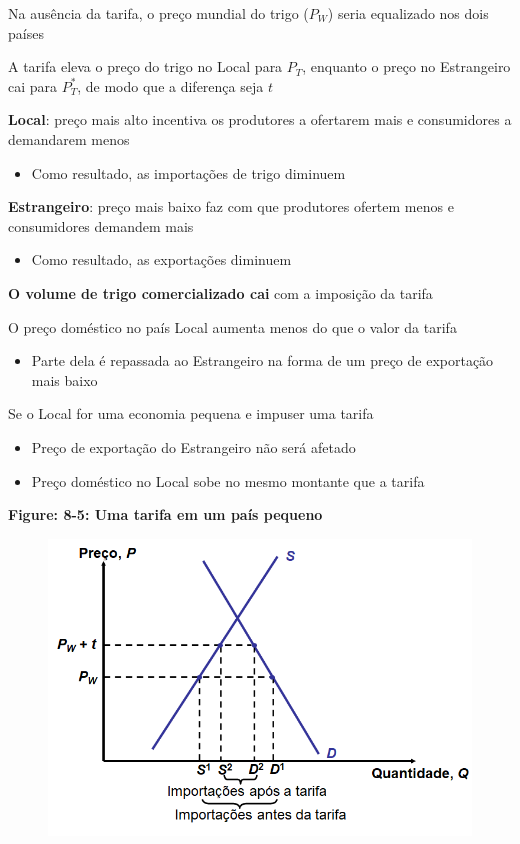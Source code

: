 \documentclass[a4paper,12pt]{article}[abntex2]
\begin{document}
Na ausência da tarifa, o preço mundial do trigo ($P_W$) seria equalizado nos dois países

A tarifa eleva o preço do trigo no Local para $P_T$, enquanto o preço no Estrangeiro cai para $P_T^*$, de modo que a diferença seja $t$

\textbf{Local}: preço mais alto incentiva os produtores a ofertarem mais e consumidores a demandarem menos
\begin{itemize}
  \item Como resultado, as importações de trigo diminuem
\end{itemize}

\textbf{Estrangeiro}: preço mais baixo faz com que produtores ofertem menos e consumidores demandem mais
\begin{itemize}
  \item Como resultado, as exportações diminuem
\end{itemize}

\textbf{O volume de trigo comercializado cai} com a imposição da tarifa

O preço doméstico no país Local aumenta menos do que o valor da tarifa
\begin{itemize}
  \item Parte dela é repassada ao Estrangeiro na forma de um preço de exportação mais baixo
\end{itemize}

Se o Local for uma economia pequena e impuser uma tarifa
\begin{itemize}
  \item Preço de exportação do Estrangeiro não será afetado
  \item Preço doméstico no Local sobe no mesmo montante que a tarifa
\end{itemize}

\textbf{Figure: 8-5: Uma tarifa em um país pequeno}
\begin{figure}[H]
    \centering
    \includegraphics[width=0.7\linewidth]{Imagens/a20i1.png}
\end{figure}
\end{document}
